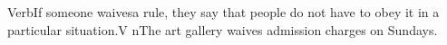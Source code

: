 Verb If someone \firstoftypelastoftypewordusedefinitionfirstoftypelastoftypesensearticlesectionletter waives  a rule, they say that people do not have to obey it in a particular situation.\exampleusefirstoftypelastoftypesensearticlesectionletter V n\examplesensearticlesectionletter The art gallery waives admission charges on Sundays.

\bye
